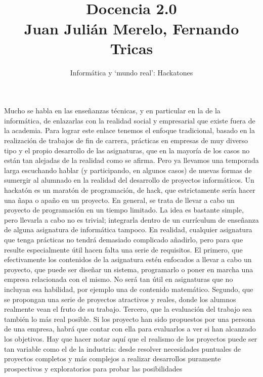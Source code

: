 \documentclass[twoside,10pt]{article}
\title{\ \\ Docencia 2.0\\ \large Juan Juli\'an Merelo, Fernando 
Tricas}
\author{\LARGE Inform\'atica y `mundo real': Hackatones }
\date{}
\begin{document}
\addtocounter{page}{2}

\maketitle
\vspace*{2ex}

\begin{multicols}{2}
Mucho se habla en las ense\~{n}anzas t\'ecnicas, y en particular en la
de la inform\'atica, de enlazarlas con la realidad social y
empresarial que existe fuera de la academia.  Para lograr este enlace
tenemos el enfoque tradicional, basado en la realizaci\'{o}n de
trabajos de fin de carrera, pr\'acticas en empresas de muy diverso
tipo y el propio desarrollo de las asignaturas, que en la mayor\'{i}a
de los casos no est\'an tan alejadas de la realidad como se afirma.
Pero ya llevamos una temporada larga escuchando hablar (y
participando, en algunos casos) de nuevas formas de sumergir al
alumnado en la realidad del desarrollo de proyectos inform\'aticos.
Un hackat\'{o}n es un marat\'{o}n de programaci\'{o}n, de hack, que
estrictamente ser\'{i}a hacer una \~{n}apa o apa\~{n}o en un proyecto.
En general, se trata de llevar a cabo un proyecto de programaci\'{o}n
en un tiempo limitado.  La idea es bastante simple, pero llevarla a
cabo no es trivial; integrarla dentro de un curr\'{i}culum de
ense\~{n}anza de alguna asignatura de inform\'atica tampoco.  En
realidad, cualquier asignatura que tenga pr\'acticas no tendr\'a
demasiado complicado a\~{n}adirlo, pero para que resulte especialmente
\'{u}til hacen falta una serie de requisitos.  El primero, que
efectivamente los contenidos de la asignatura est\'en enfocados a
llevar a cabo un proyecto, que puede ser dise\~{n}ar un sistema,
programarlo o poner en marcha una empresa relacionada con el mismo.
No ser\'a tan \'{u}til en asignaturas que no incluyan esa habilidad,
por ejemplo una de contenido matem\'atico.  Segundo, que se propongan
una serie de proyectos atractivos y reales, donde los alumnos
realmente vean el fruto de su trabajo.  Tercero, que la evaluaci\'{o}n
del trabajo sea tambi\'en lo m\'as real posible.  Si los proyecto han
sido propuestos por una persona de una empresa, habr\'a que contar con
ella para evaluarlos a ver si han alcanzado los objetivos.  Hay que
hacer notar aqu\'{i} que el realismo de los proyectos puede ser tan
variable como el de la industria: desde resolver necesidades puntuales
de proyectos completos y m\'as complejos a realizar desarrollos
puramente prospectivos y exploratorios para probar las posibilidades

\end{multicols}
\end{document}
